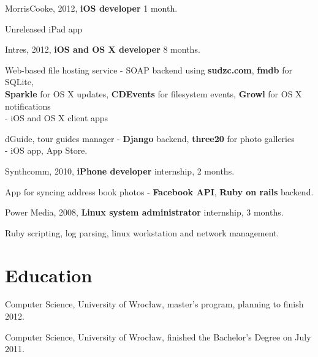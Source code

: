 \documentclass[letterpaper]{article}
\renewenvironment{itemize}{
  \begin{list}{}{
    \setlength{\leftmargin}{1.5em}
  }
}{
  \end{list}
}
\begin{document}
\begin{itemize}
	\item MorrisCooke, 2012, {\bf iOS developer} 1 month.
		\begin{itemize}
			\item Unreleased iPad app
		\end{itemize}


	\item Intres, 2012, {\bf iOS and OS X developer} 8 months.
		\begin{itemize}
		    \item Web-based file hosting service - SOAP backend using {\bf sudzc.com}, {\bf fmdb} for SQLite,\\
			{\bf Sparkle} for OS X updates, {\bf CDEvents} for filesystem events, {\bf Growl} for OS X notifications \\
				- iOS and OS X client apps
			\item dGuide, tour guides manager - {\bf Django} backend, {\bf three20} for photo galleries \\
				- iOS app, App Store.
		\end{itemize}
	\item Synthcomm, 2010, {\bf iPhone developer} internship, 2 months.
		\begin{itemize}
			\item App for syncing address book photos - {\bf Facebook API}, {\bf Ruby on rails} backend.
		\end{itemize}
	\item Power Media, 2008, {\bf Linux system administrator} internship, 3 months.
		\begin{itemize}
			\item Ruby scripting, log parsing, linux workstation and network management.
		\end{itemize}
\end{itemize}

\section*{Education}

\begin{itemize}
  	\item Computer Science, University of Wrocław, master's program, planning to finish 2012.
  	\item Computer Science, University of Wrocław, finished the Bachelor's Degree on July 2011.
\end{itemize}
\end{document}

